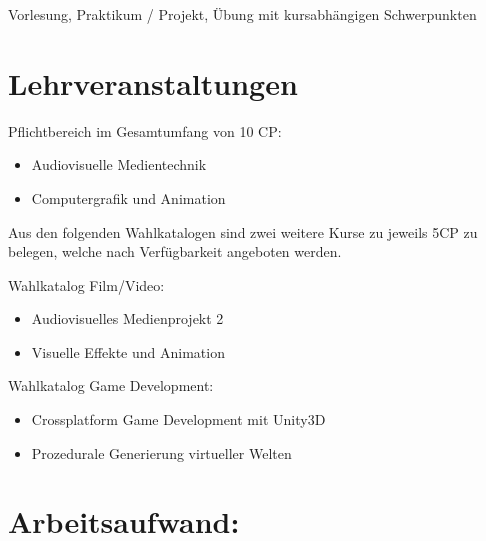 Vorlesung, Praktikum / Projekt, Übung mit kursabhängigen Schwerpunkten

\section*{Lehrveranstaltungen}\label{lehrveranstaltungen}

Pflichtbereich im Gesamtumfang von 10 CP:

\begin{itemize}
\item
  Audiovisuelle Medientechnik
\item
  Computergrafik und Animation
\end{itemize}

Aus den folgenden Wahlkatalogen sind zwei weitere Kurse zu jeweils 5CP
zu belegen, welche nach Verfügbarkeit angeboten werden.

Wahlkatalog Film/Video:

\begin{itemize}
\item
  Audiovisuelles Medienprojekt 2
\item
  Visuelle Effekte und Animation
\end{itemize}

Wahlkatalog Game Development:

\begin{itemize}
\item
  Crossplatform Game Development mit Unity3D
\item
  Prozedurale Generierung virtueller Welten
\end{itemize}

\section*{Arbeitsaufwand:}\label{arbeitsaufwand-24}

